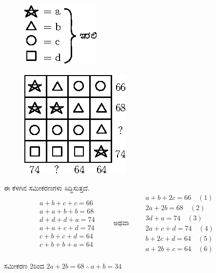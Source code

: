 \begin{enumerate}
\begin{minipage}[c]{4cm}
\begin{figure}[H]
\centering
\includegraphics[scale=1.1]{images/chap6/ans30.eps}
\end{figure}
\end{minipage}
\begin{minipage}[c]{4cm}
\begin{figure}[H]
\centering
\includegraphics{images/chap6/q30.eps}
\end{figure}
\end{minipage}

ಈ ಕೆಳಗಿನ ಸಮೀಕರಣಗಳು ಸಿದ್ಧಿಸುತ್ತದೆ. 
\begin{equation*}
\begin{aligned}
a+b+c+c=66\\
a+a+b+b=68\\
d+d+d+a=74\\
a+a+c+d=74\\
c+b+c+d=64\\
c+b+b+a=64
\end{aligned}
\qquad\text{ ಅಥವಾ}\qquad
\begin{aligned}
a+b+2c=66\quad(1)\\
2a+2b=68\quad(2)\\
3d+a=74\quad(3)\\
2a+c+d=74\quad(4)\\
b+2c+d=64\quad(5)\\
a+2b+c=64\quad(6)
\end{aligned}
\end{equation*}

ಸಮೀಕರಣ 2ರಿಂದ $2a+2b = 68~ \therefore~ a+b = 34$


\end{enumerate}
